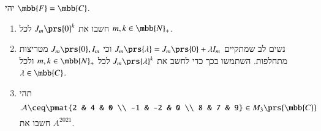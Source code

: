 \documentclass[a4paper,10pt,oneside,openany]{article}
\begin{document}
\begin{exercise}
יהי
$\mbb{F} = \mbb{C}$.
\begin{enumerate}
\item
חשבו את
$J_m\prs{0}^k$
לכל
$m,k \in \mbb{N}_+$.

\item
נשים לב שמתקיים
$J_m\prs{\lambda} = J_m\prs{0} + \lambda I_m$
וכי
$J_m\prs{0}, I_m$
מטריצות מתחלפות. השתמשו בכך כדי לחשב את
$J_m\prs{\lambda}^k$
לכל
$m,k \in \mbb{N}_+$
ולכל
$\lambda \in \mbb{C}$.

\item תהי
\[\text{.} A \ceq \pmat{2 & 4 & 0 \\ -1 & -2 & 0 \\ 8 & 7 & 9} \in M_3\prs{\mbb{C}}\]
חשבו את
$A^{2021}$.
\end{enumerate}
\end{exercise}
\end{document}
